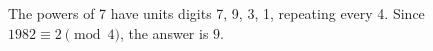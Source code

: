 The powers of 7 have units digits 7, 9, 3, 1, repeating every 4. Since $1982\equiv2\pmod4$, the answer is $\boxed9$.
